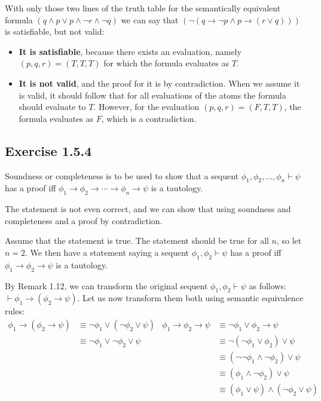 \documentclass{article}
\newcommand{\imp}{\ensuremath{\rightarrow}}
\newcommand{\seq}{\ensuremath{\vdash}}
\newcommand{\fneg}[1]{\ensuremath{\left(\neg #1 \right)}}
\newcommand{\fland}[2]{\ensuremath{\left( #1 \land #2 \right)}}
\newcommand{\flor}[2]{\ensuremath{\left( #1 \lor #2 \right)}}
\newcommand{\Fneg}[1]{\ensuremath{\neg #1}}
\newcommand{\FlanD}[2]{\ensuremath{#1 \land #2}}
\newcommand{\FloR}[2]{\ensuremath{#1 \lor #2}}
\newcommand{\FimP}[2]{\ensuremath{#1 \imp #2}}
\newcommand{\Fimp}[2]{\ensuremath{#1 \imp \left( #2 \right)}}
\begin{document}
With only those two lines of the truth table for the
semantically equivalent formula
$\flor{\FlanD{q}{p}}{p \land \Fneg{r} \land \Fneg{q}}$
we can say that
$\fneg{\fland{\FimP{q}{\Fneg{p}}}{\Fimp{p}{\FloR{r}{q}}}}$
is satisfiable, but not valid:
\begin{itemize}
\item
\textbf{It is satisfiable}, because there exists an evaluation,
namely $(p, q, r) = (T, T, T)$ for which
the formula evaluates as $T$.
\item
\textbf{It is not valid}, and the proof for it is by contradiction.
When we assume it is valid, it should follow that
for all evaluations of the atoms the formula should
evaluate to $T$. However, for the evaluation
$(p, q, r) = (F, T, T)$, the formula evaluates as $F$,
which is a contradiction.
\end{itemize}


\subsection{Exercise 1.5.4} %
Soundness or completeness is to be used to show that
a sequent $\phi_1, \phi_2, \dotsc, \phi_n \seq \psi$
has a proof iff
$\phi_1 \imp \phi_2 \imp \dotsb \imp \phi_n \imp \psi$
is a tautology.

The statement is not even correct, and we can show that using
soundness and completeness and a proof by contradiction.

Assume that the statement is true. The statement should be true
for all $n$, so let $n = 2$. We then have a statement saying
a sequent $\phi_1, \phi_2 \seq \psi$
has a proof iff $\phi_1 \imp \phi_2 \imp \psi$
is a tautology.

By Remark 1.12, we can transform
the original sequent $\phi_1, \phi_2 \seq \psi$
as follows: $\seq \phi_1 \imp (\phi_2 \imp \psi)$.
Let us now transform them both using semantic equivalence rules:
\begin{align*}
\phi_1 \imp (\phi_2 \imp \psi) &\equiv \neg\phi_1 \lor (\neg\phi_2 \lor \psi)  &  \phi_1 \imp \phi_2 \imp \psi &\equiv \neg\phi_1 \lor \phi_2 \imp \psi\\
                               &\equiv \neg\phi_1 \lor \neg\phi_2 \lor \psi    &                               &\equiv \neg(\neg\phi_1 \lor \phi_2) \lor \psi\\
                               &                                               &                               &\equiv (\neg\neg\phi_1 \land \neg\phi_2) \lor \psi\\
                               &                                               &                               &\equiv (\phi_1 \land \neg\phi_2) \lor \psi\\
                               &                                               &                               &\equiv (\phi_1 \lor \psi) \land (\neg\phi_2 \lor \psi)
\end{align*}
\end{document}
